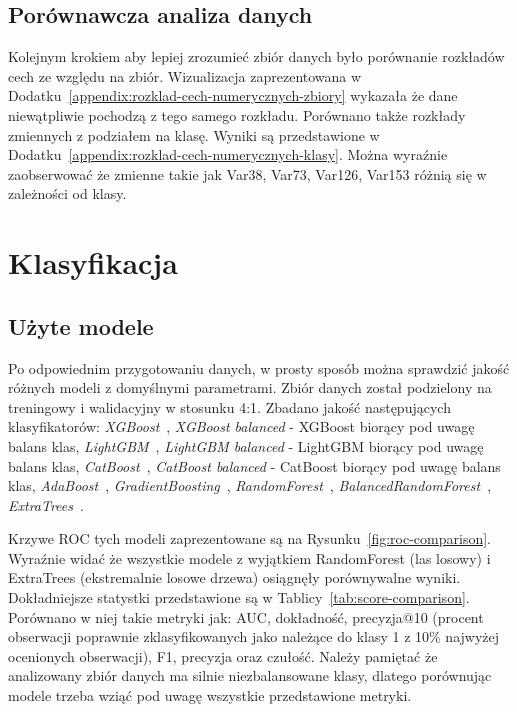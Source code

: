 \documentclass[a4paper,12pt]{article}
\begin{document}
    \subsection{Porównawcza analiza danych}
    Kolejnym krokiem aby lepiej zrozumieć zbiór danych było porównanie rozkładów cech ze względu na zbiór.
    Wizualizacja zaprezentowana w Dodatku~\ref{appendix:rozklad-cech-numerycznych-zbiory} wykazała że dane niewątpliwie pochodzą z tego samego rozkładu.
    Porównano także rozkłady zmiennych z podziałem na klasę.
    Wyniki są przedstawione w Dodatku~\ref{appendix:rozklad-cech-numerycznych-klasy}.
    Można wyraźnie zaobserwować że zmienne takie jak Var38, Var73, Var126, Var153 różnią się w zależności od klasy.

    \section{Klasyfikacja}

    \subsection{Użyte modele}

    Po odpowiednim przygotowaniu danych, w prosty sposób można sprawdzić jakość różnych modeli z domyślnymi parametrami.
    Zbiór danych został podzielony na treningowy i walidacyjny w stosunku 4:1.
    Zbadano jakość następujących klasyfikatorów: \textit{XGBoost}~\cite{xgboost}, \textit{XGBoost balanced} - XGBoost biorący pod uwagę balans klas, \textit{LightGBM}~\cite{lightgbm}, \textit{LightGBM balanced} - LightGBM biorący pod uwagę balans klas, \textit{CatBoost}~\cite{catboost}, \textit{CatBoost balanced} - CatBoost biorący pod uwagę balans klas, \textit{AdaBoost}~\cite{adaboost}, \textit{GradientBoosting}~\cite{gradient-boosting}, \textit{RandomForest}~\cite{random-forest}, \textit{BalancedRandomForest}~\cite{balanced-random-forest}, \textit{ExtraTrees}~\cite{extra-trees}.

    Krzywe ROC tych modeli zaprezentowane są na Rysunku~\ref{fig:roc-comparison}.
    Wyraźnie widać że wszystkie modele z wyjątkiem RandomForest (las losowy) i ExtraTrees (ekstremalnie losowe drzewa) osiągnęły porównywalne wyniki.
    Dokładniejsze statystki przedstawione są w Tablicy~\ref{tab:score-comparison}.
    Porównano w niej takie metryki jak: AUC, dokładność, precyzja@10 (procent obserwacji poprawnie zklasyfikowanych jako należące do klasy 1 z 10\% najwyżej ocenionych obserwacji), F1, precyzja oraz czułość.
    Należy pamiętać że analizowany zbiór danych ma silnie niezbalansowane klasy, dlatego porównując modele trzeba wziąć pod uwagę wszystkie przedstawione metryki.
\end{document}
